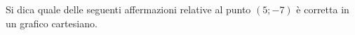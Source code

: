 Si dica quale delle seguenti affermazioni relative al punto $(5; -7)$ è corretta
in un grafico cartesiano.